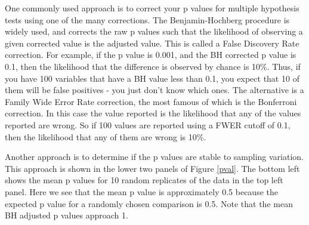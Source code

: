 \documentclass[11pt]{article}\usepackage[]{graphicx}\usepackage[]{color}
\begin{document}
One commonly used approach is to correct your p values for multiple hypothesis tests using one of the many corrections. The Benjamin-Hochberg procedure is widely used, and corrects the raw p values such that the likelihood of observing a given corrected value is the adjusted value. This is called a False Discovery Rate correction. For example, if the p value is 0.001, and the BH corrected p value is 0.1, then the likelihood that the difference is observed by chance is 10\%. Thus, if you have 100 variables that have a BH value less than 0.1, you expect that 10 of them will be false positives - you just don't know which ones. The alternative is a Family Wide Error Rate correction, the most famous of which is the Bonferroni correction. In this case the value reported is the likelihood that any of the values reported are wrong. So if 100 values are reported using a FWER cutoff of 0.1, then the likelihood that any of them are wrong is 10\%.

Another approach is to determine if the p values are stable to sampling variation. This approach is shown in the lower two panels of Figure \ref{pval}. The bottom left shows the mean p values for 10 random replicates of the data in the top left panel. Here we see that the mean p value is approximately 0.5 because the expected p value for a randomly chosen comparison is 0.5. Note that the mean BH adjusted p values approach 1.


\end{document}
